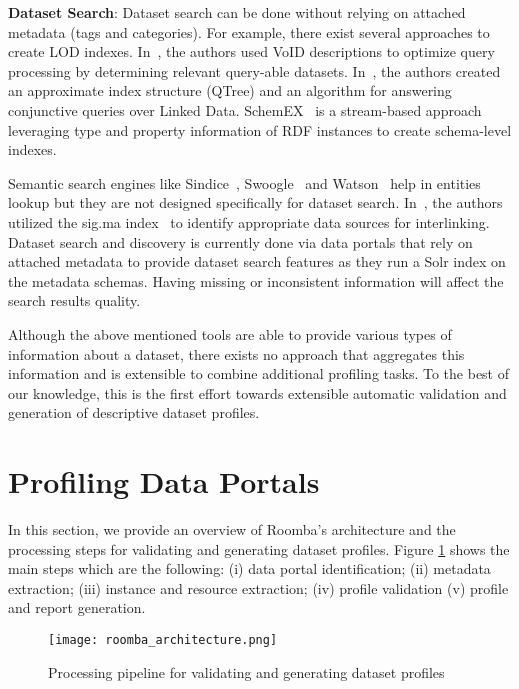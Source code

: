 \textbf{Dataset Search}: Dataset search can be done without relying on attached metadata (tags and categories). For example, there exist several approaches to create LOD indexes. In~\cite{Alexander:LDOW:09}, the authors used VoID descriptions to optimize query processing by determining relevant query-able datasets. In~\cite{Harth:WWW:10}, the authors created an approximate index structure (QTree) and an algorithm for answering conjunctive queries over Linked Data. SchemEX~\cite{Konrath:WebSemJorunal:12} is a stream-based approach leveraging type and property information of RDF instances to create schema-level indexes.

Semantic search engines like Sindice~\cite{Delbru:ESWC:10}, Swoogle~\cite{Ding:CIKM:04} and Watson~\cite{daquin:SemWebJorunal:11} help in entities lookup but they are not designed specifically for dataset search. In~\cite{Nikolov:JIST:11}, the authors utilized the sig.ma index~\cite{Tummarello:WebSemJorunal:10} to identify appropriate data sources for interlinking. Dataset search and discovery is currently done via data portals that rely on attached metadata to provide dataset search features as they run a Solr index on the metadata schemas. Having missing or inconsistent information will affect the search results quality.

Although the above mentioned tools are able to provide various types of information about a dataset, there exists no approach that aggregates this information and is extensible to combine additional profiling tasks. To the best of our knowledge, this is the first effort towards extensible automatic validation and generation of descriptive dataset profiles.


\section{Profiling Data Portals}
\label{section:roomba-framework}
In this section, we provide an overview of Roomba's architecture and the processing steps for validating and generating dataset profiles. Figure \ref{fig:Roomba_architecture} shows the main steps which are the following: (i) data portal identification; (ii) metadata extraction; (iii) instance and resource extraction; (iv) profile validation (v) profile and report generation.

\begin{figure}[!ht]
  \centering
  \texttt{[image: roomba\_architecture.png]}
  \caption{Processing pipeline for validating and generating dataset profiles}
  \label{fig:Roomba_architecture}
\end{figure}

